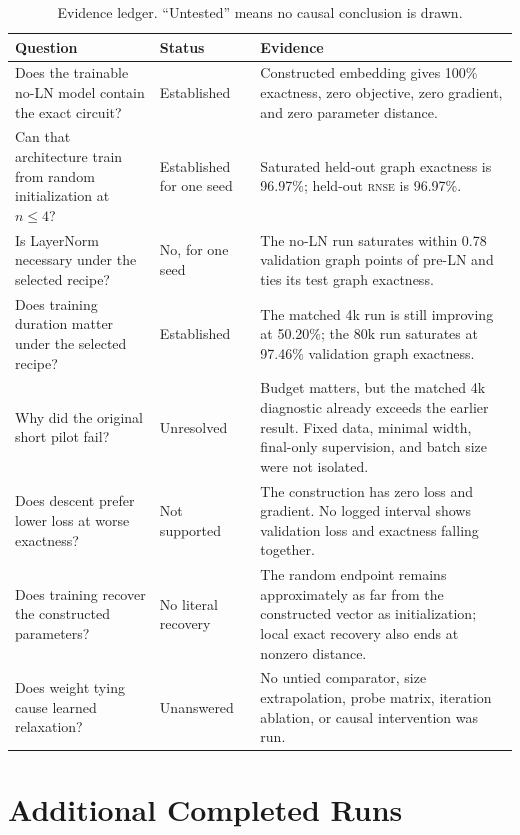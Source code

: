 \documentclass[10pt,twocolumn]{article}
\newcommand{\rnse}{\textsc{rnse}}
\begin{document}
\begin{table}[t]
\centering
\caption{Evidence ledger. ``Untested'' means no causal conclusion is drawn.}
\label{tab:ledger}
\small
\begin{tabularx}{\textwidth}{>{\raggedright\arraybackslash}p{}>{\raggedright\arraybackslash}p{}>{\raggedright\arraybackslash}X}
\toprule
Question & Status & Evidence \\
\midrule
Does the trainable no-LN model contain the exact circuit? &
Established &
Constructed embedding gives 100\% exactness, zero objective, zero gradient,
and zero parameter distance. \\
Can that architecture train from random initialization at \(n\le4\)? &
Established for one seed &
Saturated held-out graph exactness is 96.97\%; held-out \rnse{} is 96.97\%. \\
Is LayerNorm necessary under the selected recipe? &
No, for one seed &
The no-LN run saturates within 0.78 validation graph points of pre-LN and ties
its test graph exactness. \\
Does training duration matter under the selected recipe? &
Established &
The matched 4k run is still improving at 50.20\%; the 80k run saturates at
97.46\% validation graph exactness. \\
Why did the original short pilot fail? &
Unresolved &
Budget matters, but the matched 4k diagnostic already exceeds the earlier
result. Fixed data, minimal width, final-only supervision, and batch size were
not isolated. \\
Does descent prefer lower loss at worse exactness? &
Not supported &
The construction has zero loss and gradient. No logged interval shows
validation loss and exactness falling together. \\
Does training recover the constructed parameters? &
No literal recovery &
The random endpoint remains approximately as far from the constructed vector
as initialization; local exact recovery also ends at nonzero distance. \\
Does weight tying cause learned relaxation? &
Unanswered &
No untied comparator, size extrapolation, probe matrix, iteration ablation, or
causal intervention was run. \\
\bottomrule
\end{tabularx}
\end{table}

\section{Additional Completed Runs}
\end{document}
